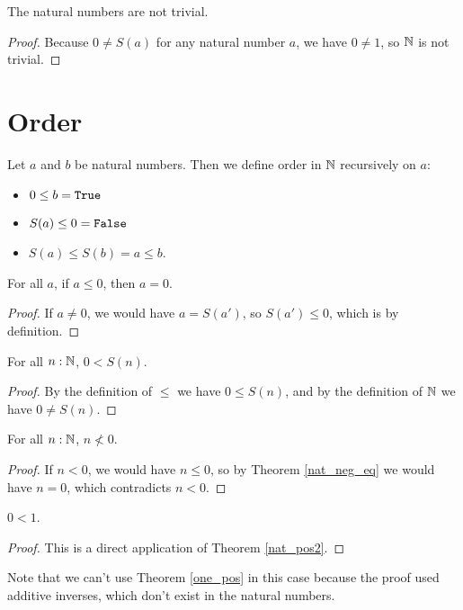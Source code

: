 \documentclass[../../math.tex]{subfiles}
\begin{document}
\begin{instance}
    The natural numbers are not trivial.
\end{instance}
\begin{proof}
    Because $0 \neq S(a)$ for any natural number $a$, we have $0 \neq 1$, so
    $\mathbb{N}$ is not trivial.
\end{proof}

\section{Order}

\begin{instance}
    Let $a$ and $b$ be natural numbers.  Then we define order in $\mathbb{N}$
    recursively on $a$:
    \begin{itemize}
        \item $0 \leq b = \vtt{True}$
        \item $S(a) \leq 0 = \vtt{False}$
        \item $S(a) \leq S(b) = a \leq b$.
    \end{itemize}
\end{instance}

\begin{theorem} \label{nat_neg_eq}
    For all $a$, if $a \leq 0$, then $a = 0$.
\end{theorem}
\begin{proof}
    If $a \neq 0$, we would have $a = S(a')$, so $S(a') \leq 0$, which is
     by definition.
\end{proof}

\begin{theorem} \label{nat_pos2}
    For all $n : \mathbb{N}$, $0 < S(n)$.
\end{theorem}
\begin{proof}
    By the definition of $\leq$ we have $0 \leq S(n)$, and by the definition of
    $\mathbb{N}$ we have $0 \neq S(n)$.
\end{proof}

\begin{theorem} \label{nat_neg2}
    For all $n : \mathbb{N}$, $n \nless 0$.
\end{theorem}
\begin{proof}
    If $n < 0$, we would have $n \leq 0$, so by Theorem \ref{nat_neg_eq} we
    would have $n = 0$, which contradicts $n < 0$.
\end{proof}

\begin{theorem}
    $0 < 1$.
\end{theorem}
\begin{proof}
    This is a direct application of Theorem \ref{nat_pos2}.
\end{proof}
\noindent Note that we can't use Theorem \ref{one_pos} in this case because the
proof used additive inverses, which don't exist in the natural numbers.
\end{document}
